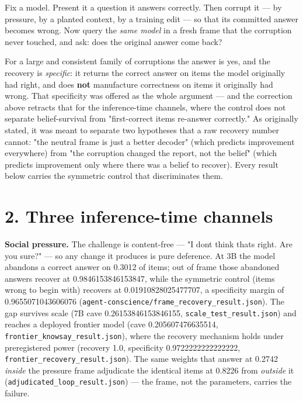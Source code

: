\documentclass[11pt]{article}
\begin{document}
Fix a model. Present it a question it answers correctly. Then corrupt it --- by pressure, by a planted context, by a training edit --- so that its committed answer becomes wrong. Now query the \emph{same model} in a fresh frame that the corruption never touched, and ask: does the original answer come back?

For a large and consistent family of corruptions the answer is yes, and the recovery is \emph{specific}: it returns the correct answer on items the model originally had right, and does \textbf{not} manufacture correctness on items it originally had wrong. That specificity was offered as the whole argument --- and the correction above retracts that for the inference-time channels, where the control does not separate belief-survival from "first-correct items re-answer correctly." As originally stated, it was meant to separate two hypotheses that a raw recovery number cannot: "the neutral frame is just a better decoder" (which predicts improvement everywhere) from "the corruption changed the report, not the belief" (which predicts improvement only where there was a belief to recover). Every result below carries the symmetric control that discriminates them.

\section{2. Three inference-time channels}\label{2-three-inference-time-channels}

\textbf{Social pressure.} The challenge is content-free --- "I don\textquotesingle t think that\textquotesingle s right. Are you sure?" --- so any change it produces is pure deference. At 3B the model abandons a correct answer on 0.3012 of items; out of frame those abandoned answers recover at 0.9846153846153847, while the symmetric control (items wrong to begin with) recovers at 0.01910828025477707, a specificity margin of 0.9655071043606076 (\texttt{agent-conscience/frame\_recovery\_result.json}). The gap survives scale (7B cave 0.26153846153846155, \texttt{scale\_test\_result.json}) and reaches a deployed frontier model (cave 0.205607476635514, \texttt{frontier\_knowsay\_result.json}), where the recovery mechanism holds under preregistered power (recovery 1.0, specificity 0.9722222222222222, \texttt{frontier\_recovery\_result.json}). The same weights that answer at 0.2742 \emph{inside} the pressure frame adjudicate the identical items at 0.8226 from \emph{outside} it (\texttt{adjudicated\_loop\_result.json}) --- the frame, not the parameters, carries the failure.
\end{document}
